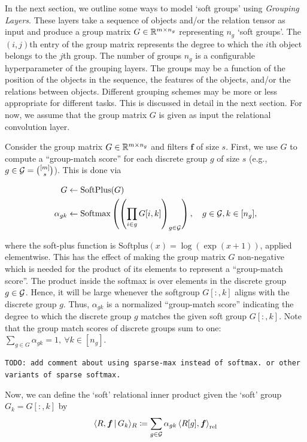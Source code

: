 In the next section, we outline some ways to model `soft groups' using \textit{Grouping Layers}. These layers take a sequence of objects and/or the relation tensor as input and produce a group matrix $G \in \mathbb{R}^{m \times n_g}$ representing $n_g$ `soft groups'. The $(i,j)$th entry of the group matrix represents the degree to which the $i$th object belongs to the $j$th group. The number of groups $n_g$ is a configurable hyperparameter of the grouping layers. The groups may be a function of the position of the objects in the sequence, the features of the objects, and/or the relations between objects. Different grouping schemes may be more or less appropriate for different tasks. This is discussed in detail in the next section. For now, we assume that the group matrix $G$ is given as input the relational convolution layer.

Consider the group matrix $G \in \mathbb{R}^{m \times n_g}$ and filters $\bm{f}$ of size $s$. First, we use $G$ to compute a ``group-match score'' for each discrete group $g$ of size $s$ (e.g., $g \in {\mathcal{G}} = \binom{[m]}{s}$). This is done via

\begin{equation}
    \label{eq:group_match_score}
    \begin{split}
        G &\gets \text{SoftPlus}(G)\\
        \alpha_{gk} &\gets \text{Softmax}\left(\left(\prod_{i \in g} G[i,k]\right)_{g \in {\mathcal{G}}}\right), \quad g \in {\mathcal{G}}, k \in [n_g],
    \end{split}
\end{equation}

where the soft-plus function is $\text{Softplus}(x) = \log(\exp(x + 1))$, applied elementwise. This has the effect of making the group matrix $G$ non-negative which is needed for the product of its elements to represent a ``group-match score''. The product inside the softmax is over elements in the discrete group $g \in {\mathcal{G}}$. Hence, it will be large whenever the softgroup $G[:, k]$ aligns with the discrete group $g$. Thus, $\alpha_{gk}$ is a normalized ``group-match score'' indicating the degree to which the discrete group $g$ matches the given soft group $G[:,k]$. Note that the group match scores of discrete groups sum to one: $\sum_{g \in G} \alpha_{gk} = 1, \ \forall k \in [n_g]$.

\texttt{TODO: add comment about using sparse-max instead of softmax. or other variants of sparse softmax.}

Now, we can define the `soft' relational inner product given the `soft' group $G_k = G[:, k]$ by
\begin{equation}
    \label{eq:soft_relational_inner_prod}
    \langle R, \boldsymbol{f} \, \vert \, G_k \rangle_R \coloneqq \sum_{g \in {\mathcal{G}}} \alpha_{gk} \left \langle R[g], \boldsymbol{f} \right\rangle_\mathrm{rel}
\end{equation}

